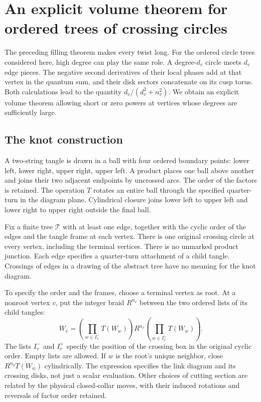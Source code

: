 \chapter{An explicit volume theorem for ordered trees of crossing
circles}\label{ch:quantitative-circle-trees}

The preceding filling theorem makes every twist long. For the ordered
circle trees considered here, high degree can play the same role.
A degree-$d_v$ circle meets $d_v$ edge pieces. The negative second
derivatives of their local phases add at that vertex in the quantum
sum, and their disk sectors concatenate on its cusp torus.
Both calculations lead to the quantity $d_v/(d_v^2+n_v^2)$.
We obtain an explicit volume theorem allowing short or zero powers
at vertices whose degrees are sufficiently large.

\section{The knot construction}\label{sec:circle-the-knot-construction}

A two-string tangle is drawn in a ball with four ordered boundary
points: lower left, lower right, upper right, upper left. A product
places one ball above another and joins their two adjacent endpoints by
uncrossed arcs. The order of the factors is retained. The operation
\(T\) rotates an entire ball through the specified quarter-turn in the
diagram plane. Cylindrical closure joins lower left to upper left and
lower right to upper right outside the final ball.

Fix a finite tree \(\mathcal T\) with at least one edge, together with
the cyclic order of the edges and the tangle frame at each vertex. There
is one original crossing circle at every vertex, including the terminal
vertices. There is no unmarked product junction. Each edge specifies a quarter-turn attachment of a child tangle.
Crossings of edges in a drawing of the abstract tree have no meaning
for the knot diagram.

To specify the order and the frames, choose a terminal vertex as root.
At a nonroot vertex \(v\), put the integer
braid \(R^{n_v}\) between the two ordered lists of its child tangles: \begin{equation}
 W_v=\left(\prod_{w\in I_v^-}T(W_w)\right)R^{n_v}
       \left(\prod_{w\in I_v^+}T(W_w)\right).
 \label{eq:circle-1}
\end{equation} The lists \(I_v^-\) and \(I_v^+\) specify the position of the
crossing box in the original cyclic order. Empty lists are allowed. If
\(w\) is the root's unique neighbor, close \(R^{n_0}T(W_w)\)
cylindrically. The expression specifies the link diagram and its crossing disks,
not just a scalar evaluation. Other choices of cutting
section are related by the physical closed-collar moves, with their
induced rotations and reversals of factor order retained.

